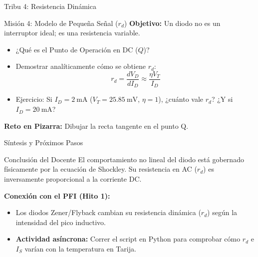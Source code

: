 \documentclass[10pt, aspectratio=169]{beamer}
\begin{document}
\begin{frame}{Tribu 4: Resistencia Dinámica}
  \begin{block}{\faWaveSquare \quad Misión 4: Modelo de Pequeña Señal ($r_d$)}
    \textbf{Objetivo:} Un diodo no es un interruptor ideal; es una resistencia variable.
    \vspace{0.2cm}
    \begin{itemize}
        \item ¿Qué es el Punto de Operación en DC ($Q$)?
        \item Demostrar analíticamente cómo se obtiene $r_d$:
        \begin{equation*}
            r_d = \frac{d V_D}{d I_D} \approx \frac{\eta V_T}{I_D}
        \end{equation*}
        \item Ejercicio: Si $I_D = \qty{2}{\milli\ampere}$ ($V_T = \qty{25.85}{\milli\volt}$, $\eta=1$), ¿cuánto vale $r_d$? ¿Y si $I_D = \qty{20}{\milli\ampere}$?
    \end{itemize}
  \end{block}
  \vspace{0.1cm}
  \textbf{\faChalkboard \quad Reto en Pizarra:} Dibujar la recta tangente en el punto Q.
\end{frame}

\begin{frame}{Síntesis y Próximos Pasos}
  \begin{block}{Conclusión del Docente}
      El comportamiento no lineal del diodo está gobernado físicamente por la ecuación de Shockley. Su resistencia en AC ($r_d$) es inversamente proporcional a la corriente DC.
  \end{block}
  
  \vspace{0.5cm}
  \textbf{Conexión con el PFI (Hito 1):}
  \begin{itemize}
      \item Los diodos Zener/Flyback cambian su resistencia dinámica ($r_d$) según la intensidad del pico inductivo.
      \item \textbf{Actividad asíncrona:} Correr el script en Python para comprobar cómo $r_d$ e $I_S$ varían con la temperatura en Tarija.
  \end{itemize}
\end{frame}
\end{document}
